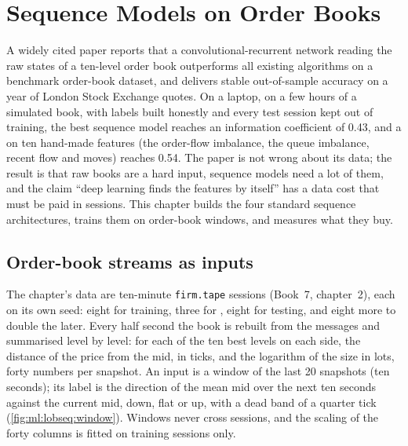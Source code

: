 \chapter{Sequence Models on Order Books}\label{ch:ml:sequence-models-on-order-books}

A widely cited paper reports that a convolutional-recurrent network reading the raw states of a ten-level order book
outperforms all existing algorithms on a benchmark order-book dataset, and delivers stable out-of-sample accuracy on a
year of London Stock Exchange quotes. On a laptop,
on a few hours of a simulated book, with labels built honestly and every test session kept out of training, the best
sequence model reaches an information coefficient of 0.43, and a  on ten hand-made features (the
order-flow imbalance, the queue imbalance, recent flow and moves) reaches 0.54. The paper is not wrong about its data; the result is that
raw books are a hard input, sequence models need a lot of them, and the claim ``deep learning finds the features by
itself'' has a data cost that must be paid in sessions. This chapter builds the four standard sequence architectures,
trains them on order-book windows, and measures what they buy.

\section{Order-book streams as inputs}

The chapter's data are ten-minute \texttt{firm.tape} sessions (Book~7, chapter~2), each on its own seed: eight for
training, three for , eight for testing, and eight more to double the  later. Every half
second the book is rebuilt from the messages and summarised level by level: for each of the ten best levels on each side,
the distance of the price from the mid, in ticks, and the logarithm of the size in lots, forty numbers per snapshot. An
input is a window of the last 20 snapshots (ten seconds); its label is the direction of the mean mid over the next ten
seconds against the current mid, down, flat or up, with a dead band of a quarter tick (\cref{fig:ml:lobseq:window}).
Windows never cross sessions, and the scaling of the forty columns is fitted on training sessions only.

